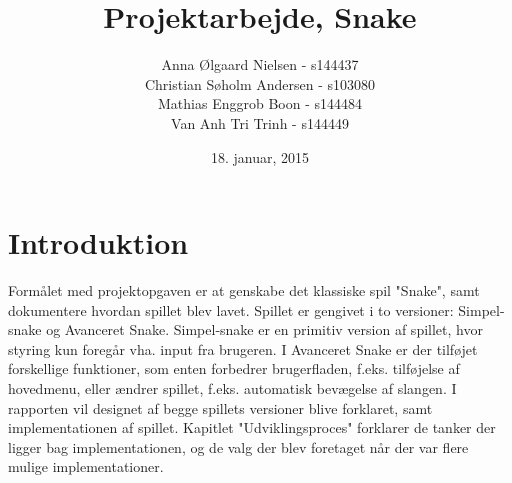 \documentclass{report}
\begin{document}
\setcounter{chapter}{0}

\title{Projektarbejde, Snake}
\date{18. januar, 2015}
\author{	Anna Ølgaard Nielsen - 			s144437\\
Christian Søholm Andersen 	- s103080\\
Mathias Enggrob Boon - 			s144484\\
Van Anh Tri Trinh - 				s144449}

\maketitle

\tableofcontents
\newpage
\setcounter{chapter}{0}
\chapter{Introduktion}
Formålet med projektopgaven er at genskabe det klassiske spil "Snake", samt dokumentere hvordan spillet blev lavet.
Spillet er gengivet i to versioner: Simpel-snake og Avanceret Snake. Simpel-snake er en primitiv version af spillet, hvor styring kun foregår vha. input fra brugeren. I Avanceret Snake er der tilføjet forskellige funktioner, som enten forbedrer brugerfladen, f.eks. tilføjelse af hovedmenu, eller ændrer spillet, f.eks. automatisk bevægelse af slangen.
I rapporten vil designet af begge spillets versioner blive forklaret, samt implementationen af spillet. Kapitlet "Udviklingsproces" forklarer de tanker der ligger bag implementationen, og de valg der blev foretaget når der var flere mulige implementationer.

\begin{figure}[b]
	\centering
	\graphicspath{ {pics/} }
	\hspace{0.1\textwidth}
\end{figure}
\end{document}
